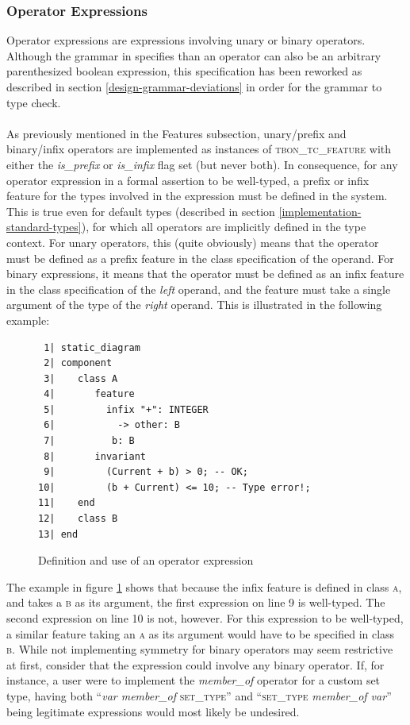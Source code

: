 \subsubsection{Operator Expressions}
Operator expressions are expressions involving unary or binary operators. Although the grammar in \cite{walden1995} specifies than an operator can also be an arbitrary parenthesized boolean expression, this specification has been reworked as described in section \ref{design-grammar-deviations} in order for the grammar to type check. 
\paragraph{}
As previously mentioned in the Features subsection, unary/prefix and binary/infix operators are implemented as instances of \textsc{tbon\_tc\_feature} with either the \textit{is\_prefix} or \textit{is\_infix} flag set (but never both). In consequence, for any operator expression in a formal assertion to be well-typed, a prefix or infix feature for the types involved in the expression must be defined in the system. This is true even for default types (described in section \ref{implementation-standard-types}), for which all operators are implicitly defined in the type context. For unary operators, this (quite obviously) means that the operator must be defined as a prefix feature in the class specification of the operand. For binary expressions, it means that the operator must be defined as an infix feature in the class specification of the \emph{left} operand, and the feature must take a single argument of the type of the \emph{right} operand. This is illustrated in the following example:
\begin{figure}[H]
{\footnotesize
\begin{verbatim}
 1| static_diagram
 2| component
 3|    class A
 4|       feature
 5|         infix "+": INTEGER
 6|           -> other: B  
 7|          b: B
 8|       invariant
 9|         (Current + b) > 0; -- OK;
10|         (b + Current) <= 10; -- Type error!;
11|    end
12|    class B
13| end
\end{verbatim}
}
\caption{Definition and use of an operator expression}
\label{fig:operator_expressions}
\end{figure}
The example in figure \ref{fig:operator_expressions} shows that because the infix feature is defined in class \textsc{a}, and takes a \textsc{b} as its argument, the first expression on line 9 is well-typed. The second expression on line 10 is not, however. For this expression to be well-typed, a similar feature taking an \textsc{a} as its argument would have to be specified in class \textsc{b}. While not implementing symmetry for binary operators may seem restrictive at first, consider that the expression could involve any binary operator. If, for instance, a user were to implement the \textit{member\_of} operator for a custom set type, having both ``\textit{var member\_of} \textsc{set\_type}''  and ``\textsc{set\_type} \textit{member\_of var}'' being legitimate expressions would most likely be undesired.
